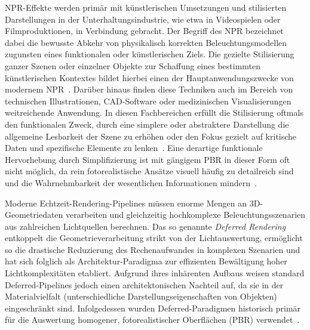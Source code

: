 \ac{NPR}-Effekte werden primär mit künstlerischen Umsetzungen und stilisierten Darstellungen in der
Unterhaltungsindustrie, wie etwa in Videospielen oder Filmproduktionen, in Verbindung gebracht.
Der Begriff des \ac{NPR} bezeichnet dabei die bewusste Abkehr von physikalisch korrekten
Beleuchtungsmodellen zugunsten eines funktionalen oder künstlerischen Ziels.
Die gezielte Stilisierung ganzer Szenen oder einzelner Objekte zur Schaffung eines bestimmten künstlerischen Kontextes
bildet hierbei einen der Hauptanwendungszwecke von modernem
\ac{NPR}~\parencite[vgl.][S.651--652]{akenine-mollerRealtimeRendering2019}.
Darüber hinaus finden diese Techniken auch im Bereich von technischen Illustrationen, \ac{CAD}-Software oder
medizinischen Visualisierungen weitreichende Anwendung.
In diesen Fachbereichen erfüllt die Stilisierung oftmals den funktionalen Zweck, durch eine simplere oder abstraktere
Darstellung die allgemeine Lesbarkeit der Szene zu erhöhen oder den Fokus gezielt auf kritische Daten und spezifische
Elemente zu lenken~\parencite[vgl.][Abschn.~2]{goochNonphotorealisticLightingModel1998}.
Eine derartige funktionale Hervorhebung durch Simplifizierung ist mit gängigem \ac{PBR} in dieser Form oft nicht
möglich, da rein fotorealistische Ansätze visuell häufig zu detailreich sind und die Wahrnehmbarkeit der wesentlichen
Informationen mindern~\parencite[vgl.][Abschn.~1]{magdicsPostprocessingNPREffects2013}.

Moderne Echtzeit-Rendering-Pipelines müssen enorme Mengen an 3D-Geometriedaten verarbeiten und gleichzeitig hochkomplexe
Beleuchtungsszenarien aus zahlreichen Lichtquellen berechnen.
Das so genannte \textit{Deferred Rendering} entkoppelt die Geometrieverarbeitung strikt von der Lichtauswertung,
ermöglicht so die drastische Reduzierung des Rechenaufwandes in komplexen Szenarien und hat sich folglich als
Architektur-Paradigma zur effizienten Bewältigung hoher Lichtkomplexitäten etabliert.
Aufgrund ihres inhärenten Aufbaus weisen standard Deferred-Pipelines jedoch einen architektonischen Nachteil auf, da sie
in der Materialvielfalt (unterschiedliche Darstellungseigenschaften von Objekten) eingeschränkt sind.
Infolgedessen wurden Deferred-Paradigmen historisch primär für die Auswertung homogener, fotorealistischer Oberflächen
(\ac{PBR}) verwendet~\parencite[vgl.][Abschn.~1]{haradaForwardBringingDeferred2012}.

